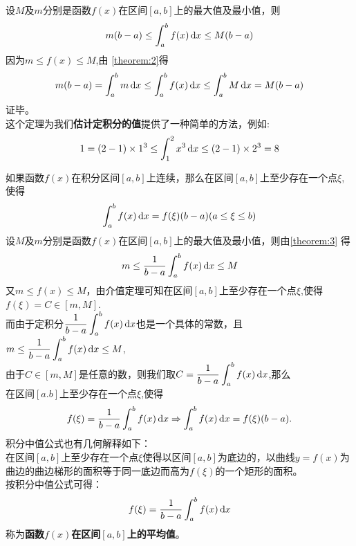 \sj
\theorem[定上下限积分性质5]
\label{theorem:3}
设$M$及$m$分别是函数$f(x)$在区间$[a,b]$上的最大值及最小值，则
\begin{equation}
	m(b-a)\leq \int_{a}^{b}f(x) \,{\rm{d}} x\leq M(b-a)
\end{equation}
\proof 因为$m\leq f(x)\leq M$,由 \ref{theorem:2}\hspace*{0.3em}得
\sj 
\begin{equation}
	\nonumber
	m(b-a)=\int_{a}^{b}m \,{\rm{d}} x\leq \int_{a}^{b}f(x) \,{\rm{d}} x\leq \int_{a}^{b}M \,{\rm{d}} x=M(b-a)
\end{equation}
证毕。\\
\kg 这个定理为我们\textbf{估计定积分的值}提供了一种简单的方法，例如:
\begin{equation}
	\nonumber
	1=(2-1)\times1^3\leq \int_{1}^{2}x^3 \,{\rm{d}} x\leq (2-1)\times2^3=8
\end{equation}

\sj
\theorem[积分中值定理]
\label{theorem:4}
如果函数$f(x)$在积分区间$[a,b]$上连续，那么在区间$[a,b]$上至少存在一个点$\xi$,使得
\begin{equation}
	\int_{a}^{b}f(x)\,{\rm{d}} x=f(\xi)(b-a)(a\leq\xi\leq b)
\end{equation}
\proof 设$M$及$m$分别是函数$f(x)$在区间$[a,b]$上的最大值及最小值，则由\ref{theorem:3}\hspace*{0.3em} 得
\begin{equation}
	\nonumber
	m\leq\frac{1}{b-a}\int_{a}^{b}f(x) \,{\rm{d}} x\leq M
\end{equation}
又$m\leq f(x)\leq M$，由介值定理可知在区间$[a,b]$上至少存在一个点$\xi$,使得$f(\xi)=C\in[m,M]$.\vspace{0.5em}\\
而由于定积分$\displaystyle\frac{1}{b-a}\int_{a}^{b}f(x)\,{\rm{d}} x$也是一个具体的常数，且$\displaystyle m\leq\frac{1}{b-a}\int_{a}^{b}f(x) \,{\rm{d}} x\leq M$,\\
由于$C\in [m,M]$是任意的数，则我们取$C=\displaystyle\frac{1}{b-a}\int_{a}^{b}f(x) \,{\rm{d}} x$,那么\\
在区间$[a.b]$上至少存在一个点$\xi$,使得
\begin{equation}
	\nonumber
	f(\xi)=\frac{1}{b-a}\int_{a}^{b}f(x)\,{\rm{d}} x \Rightarrow \int_{a}^{b}f(x)\,{\rm{d}} x=f(\xi)(b-a).
\end{equation}
\kg 积分中值公式也有几何解释如下：\\
\kg 在区间$[a,b]$上至少存在一个点$\xi$使得以区间$[a,b]$为底边的，以曲线$y=f(x)$为曲边的曲边梯形的面积等于同一底边而高为$f(\xi)$的一个矩形的面积。
\\ \kg 按积分中值公式可得：
\begin{equation}
	\nonumber
f(\xi)=\frac{1}{b-a}\int_{a}^{b}f(x) \,{\rm{d}} x
\end{equation}
称为\textbf{函数$f(x)$在区间$[a,b]$上的平均值}。
